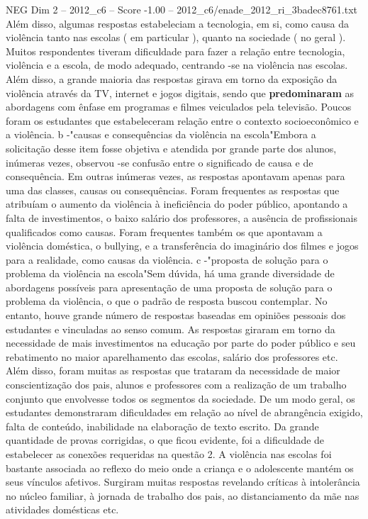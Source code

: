 \begin{textsample}{NEG Dim 2 – 2012\_c6 – Score -1.00 – 2012\_c6/enade\_2012\_ri\_3badec8761.txt}
Além disso, algumas respostas estabeleciam a tecnologia, em si, como causa da violência tanto nas escolas ( em particular ), quanto na sociedade ( no geral ).
Muitos respondentes tiveram dificuldade para fazer a relação entre tecnologia, violência e a escola, de modo adequado, centrando -se na violência nas escolas.
Além disso, a grande maioria das respostas girava em torno da exposição da violência através da TV, internet e jogos digitais, sendo que \textbf{predominaram} as abordagens com ênfase em programas e filmes veiculados pela televisão.
Poucos foram os estudantes que estabeleceram relação entre o contexto socioeconômico e a violência. b -"causas e consequências da violência na escola"Embora a solicitação desse item fosse objetiva e atendida por grande parte dos alunos, inúmeras vezes, observou -se confusão entre o significado de causa e de consequência.
Em outras inúmeras vezes, as respostas apontavam apenas para uma das classes, causas ou consequências.
Foram frequentes as respostas que atribuíam o aumento da violência à ineficiência do poder público, apontando a falta de investimentos, o baixo salário dos professores, a ausência de profissionais qualificados como causas.
Foram frequentes também os que apontavam a violência doméstica, o bullying, e a transferência do imaginário dos filmes e jogos para a realidade, como causas da violência. c -"proposta de solução para o problema da violência na escola"Sem dúvida, há uma grande diversidade de abordagens possíveis para apresentação de uma proposta de solução para o problema da violência, o que o padrão de resposta buscou contemplar.
No entanto, houve grande número de respostas baseadas em opiniões pessoais dos estudantes e vinculadas ao senso comum.
As respostas giraram em torno da necessidade de mais investimentos na educação por parte do poder público e seu rebatimento no maior aparelhamento das escolas, salário dos professores etc.
Além disso, foram muitas as respostas que trataram da necessidade de maior conscientização dos pais, alunos e professores com a realização de um trabalho conjunto que envolvesse todos os segmentos da sociedade.
De um modo geral, os estudantes demonstraram dificuldades em relação ao nível de abrangência exigido, falta de conteúdo, inabilidade na elaboração de texto escrito.
Da grande quantidade de provas corrigidas, o que ficou evidente, foi a dificuldade de estabelecer as conexões requeridas na questão 2.
A violência nas escolas foi bastante associada ao reflexo do meio onde a criança e o adolescente mantém os seus vínculos afetivos.
Surgiram muitas respostas revelando críticas à intolerância no núcleo familiar, à jornada de trabalho dos pais, ao distanciamento da mãe nas atividades domésticas etc.

\end{textsample}
